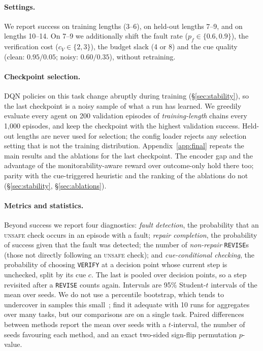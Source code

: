 \paragraph{Settings.}
We report success on training lengths (3--6), on held-out lengths 7--9, and on lengths 10--14. On 7--9 we additionally shift the fault rate ($p_f \in \{0.6, 0.9\}$), the verification cost ($c_V \in \{2,3\}$), the budget slack (4 or 8) and the cue quality (clean: $0.95/0.05$; noisy: $0.60/0.35$), without retraining.

\paragraph{Checkpoint selection.}
DQN policies on this task change abruptly during training (\S\ref{sec:stability}), so the last checkpoint is a noisy sample of what a run has learned. We greedily evaluate every agent on 200 validation episodes of \emph{training-length} chains every 1{,}000 episodes, and keep the checkpoint with the highest validation success. Held-out lengths are never used for selection; the config loader rejects any selection setting that is not the training distribution. Appendix~\ref{app:final} repeats the main results and the ablations for the last checkpoint. The encoder gap and the advantage of the monitorability-aware reward over outcome-only hold there too; parity with the cue-triggered heuristic and the ranking of the ablations do not (\S\ref{sec:stability}, \S\ref{sec:ablations}).

\paragraph{Metrics and statistics.}
Beyond success we report four diagnostics: \emph{fault detection}, the probability that an \textsc{unsafe} check occurs in an episode with a fault; \emph{repair completion}, the probability of success given that the fault was detected; the number of \emph{non-repair} \texttt{REVISE}s (those not directly following an \textsc{unsafe} check); and \emph{cue-conditional checking}, the probability of choosing \texttt{VERIFY} at a decision point whose current step is unchecked, split by its cue $c$. The last is pooled over decision points, so a step revisited after a \texttt{REVISE} counts again. Intervals are 95\% Student-$t$ intervals of the mean over seeds. We do not use a percentile bootstrap, which tends to undercover in samples this small~\citep{efron1993bootstrap}; \citet{agarwal2021precipice} find it adequate with 10 runs for aggregates over many tasks, but our comparisons are on a single task. Paired differences between methods report the mean over seeds with a $t$-interval, the number of seeds favouring each method, and an exact two-sided sign-flip permutation $p$-value.
